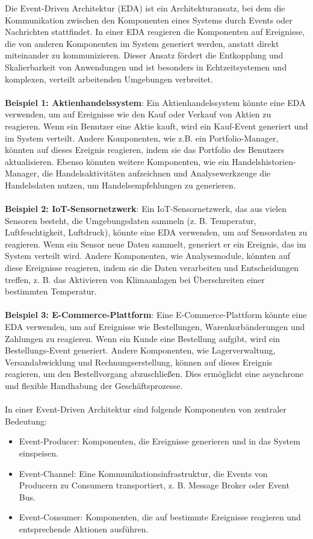 Die Event-Driven Architektur (EDA) ist ein Architekturansatz, bei dem die Kommunikation zwischen den Komponenten eines Systems durch Events oder Nachrichten stattfindet. In einer EDA reagieren die Komponenten auf Ereignisse, die von anderen Komponenten im System generiert werden, anstatt direkt miteinander zu kommunizieren. Dieser Ansatz fördert die Entkopplung und Skalierbarkeit von Anwendungen und ist besonders in Echtzeitsystemen und komplexen, verteilt arbeitenden Umgebungen verbreitet.
\\\\
\textbf{Beispiel 1: Aktienhandelssystem}: Ein Aktienhandelssystem könnte eine EDA verwenden, um auf Ereignisse wie den Kauf oder Verkauf von Aktien zu reagieren. Wenn ein Benutzer eine Aktie kauft, wird ein Kauf-Event generiert und im System verteilt. Andere Komponenten, wie z.B. ein Portfolio-Manager, könnten auf dieses Ereignis reagieren, indem sie das Portfolio des Benutzers aktualisieren. Ebenso könnten weitere Komponenten, wie ein Handelshistorien-Manager, die Handelsaktivitäten aufzeichnen und Analysewerkzeuge die Handelsdaten nutzen, um Handelsempfehlungen zu generieren.
\\\\
\textbf{Beispiel 2: IoT-Sensornetzwerk}: Ein IoT-Sensornetzwerk, das aus vielen Sensoren besteht, die Umgebungsdaten sammeln (z. B. Temperatur, Luftfeuchtigkeit, Luftdruck), könnte eine EDA verwenden, um auf Sensordaten zu reagieren. Wenn ein Sensor neue Daten sammelt, generiert er ein Ereignis, das im System verteilt wird. Andere Komponenten, wie Analysemodule, könnten auf diese Ereignisse reagieren, indem sie die Daten verarbeiten und Entscheidungen treffen, z. B. das Aktivieren von Klimaanlagen bei Überschreiten einer bestimmten Temperatur.
\\\\
\textbf{Beispiel 3: E-Commerce-Plattform}: Eine E-Commerce-Plattform könnte eine EDA verwenden, um auf Ereignisse wie Bestellungen, Warenkorbänderungen und Zahlungen zu reagieren. Wenn ein Kunde eine Bestellung aufgibt, wird ein Bestellungs-Event generiert. Andere Komponenten, wie Lagerverwaltung, Versandabwicklung und Rechnungserstellung, können auf dieses Ereignis reagieren, um den Bestellvorgang abzuschließen. Dies ermöglicht eine asynchrone und flexible Handhabung der Geschäftsprozesse.
\\\\
In einer Event-Driven Architektur sind folgende Komponenten von zentraler Bedeutung:
\begin{itemize}
\item Event-Producer: Komponenten, die Ereignisse generieren und in das System einspeisen.
\item Event-Channel: Eine Kommunikationsinfrastruktur, die Events von Producern zu Consumern transportiert, z. B. Message Broker oder Event Bus.
\item Event-Consumer: Komponenten, die auf bestimmte Ereignisse reagieren und entsprechende Aktionen ausführen.
\end{itemize}
